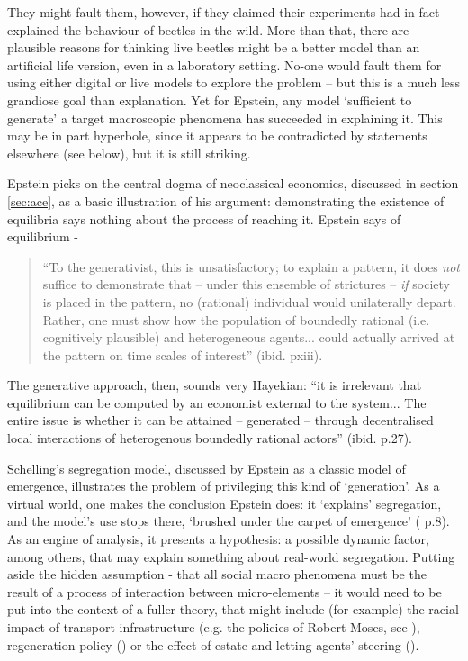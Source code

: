 They might fault them, however, if they claimed their experiments had in fact explained the behaviour of beetles in the wild. More than that, there are plausible reasons for thinking live beetles might be a better model than an artificial life version, even in a laboratory setting. No-one would fault them for using either digital or live models to explore the problem – but this is a much less grandiose goal than explanation. Yet for Epstein, any model `sufficient to generate' a target macroscopic phenomena has succeeded in explaining it. This may be in part hyperbole, since it appears to be contradicted by statements elsewhere (see below), but it is still striking. 

Epstein picks on the central dogma of neoclassical economics, discussed in section \ref{sec:ace}, as a basic illustration of his argument: demonstrating the existence of equilibria says nothing about the process of reaching it. Epstein says of equilibrium -

\begin{quote}
``To the generativist, this is unsatisfactory; to explain a pattern, it does \emph{not} suffice to demonstrate that – under this ensemble of strictures – \emph{if} society is placed in the pattern, no (rational) individual would unilaterally depart. Rather, one must show how the population of boundedly rational (i.e. cognitively plausible) and heterogeneous agents... could actually arrived at the pattern on time scales of interest'' (ibid. pxiii).
\end{quote}

The generative approach, then, sounds very Hayekian: ``it is irrelevant that equilibrium can be computed by an economist external to the system... The entire issue is whether it can be attained – generated – through decentralised local interactions of heterogenous boundedly rational actors'' (ibid. p.27). 

Schelling's segregation model, discussed by Epstein as a classic model of emergence, illustrates the problem of privileging this kind of `generation'. As a virtual world, one makes the conclusion Epstein does: it `explains' segregation, and the model's use stops there, `brushed under the carpet of emergence' (\citealt{di_paolo_simulation_2000} p.8). As an engine of analysis, it presents a hypothesis: a possible dynamic factor, among others, that may explain something about real-world segregation. Putting aside the hidden assumption - that all social macro phenomena must be the result of a process of interaction between micro-elements – it would need to be put into the context of a fuller theory, that might include (for example) the racial impact of transport infrastructure (e.g. the policies of Robert Moses, see \citealt{winner_artifacts_1980}), regeneration policy (\citealt{gaffikin_community_2011}) or the effect of estate and letting agents' steering (\citealt{phillips_race_1992}). 

